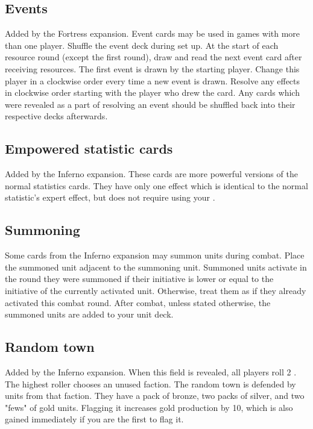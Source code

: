 \subsection*{Events}
Added by the Fortress expansion. Event cards may be used in games with more than one player. Shuffle the event deck during set up. At the start of each resource round (except the first round), draw and read the next event card after receiving resources. The first event is drawn by the starting player. Change this player in a clockwise order every time a new event is drawn. Resolve any effects in clockwise order starting with the player who drew the card. Any cards which were revealed as a part of resolving an event should be shuffled back into their respective decks afterwards.
\subsection*{Empowered statistic cards}
Added by the Inferno expansion. These cards are more powerful versions of the normal statistics cards. They have only one effect which is identical to the normal statistic's expert effect, but does not require using your .

\subsection*{Summoning}
Some cards from the Inferno expansion may summon units during combat. Place the summoned unit adjacent to the summoning unit. Summoned units activate in the round they were summoned if their initiative is lower or equal to the initiative of the currently activated unit. Otherwise, treat them as if they already activated this combat round. After combat, unless stated otherwise, the summoned units are added to your unit deck.
\subsection*{Random town}
Added by the Inferno expansion. When this field is revealed, all players roll 2 . The highest roller chooses an unused faction. The random town is defended by units from that faction. They have a pack of bronze, two packs of silver, and two "fews" of gold units. Flagging it increases gold production by 10, which is also gained immediately if you are the first to flag it.
